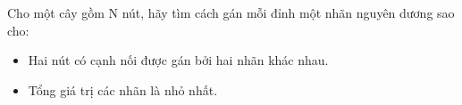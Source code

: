 Cho một cây gồm N nút, hãy tìm cách gán mỗi đỉnh một nhãn nguyên dương sao cho:
\begin{itemize}
	\item Hai nút có cạnh nối được gán bởi hai nhãn khác nhau.
	\item Tổng giá trị các nhãn là nhỏ nhất.
\end{itemize}